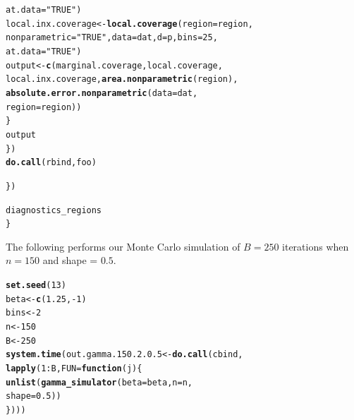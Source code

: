 \documentclass[11pt]{article}\usepackage[]{graphicx}\usepackage[]{color}
\makeatletter
\newcommand{\hlnum}[1]{\textcolor[rgb]{0.686,0.059,0.569}{#1}}%
\newcommand{\hlstr}[1]{\textcolor[rgb]{0.192,0.494,0.8}{#1}}%
\newcommand{\hlopt}[1]{\textcolor[rgb]{0,0,0}{#1}}%
\newcommand{\hlstd}[1]{\textcolor[rgb]{0.345,0.345,0.345}{#1}}%
\newcommand{\hlkwa}[1]{\textcolor[rgb]{0.161,0.373,0.58}{\textbf{#1}}}%
\newcommand{\hlkwb}[1]{\textcolor[rgb]{0.69,0.353,0.396}{#1}}%
\newcommand{\hlkwc}[1]{\textcolor[rgb]{0.333,0.667,0.333}{#1}}%
\newcommand{\hlkwd}[1]{\textcolor[rgb]{0.737,0.353,0.396}{\textbf{#1}}}%
\newenvironment{kframe}{%
 \def\at@end@of@kframe{}%
 \ifinner\ifhmode%
  \def\at@end@of@kframe{\end{minipage}}%
  \begin{minipage}{\columnwidth}%
 \fi\fi%
 \def\FrameCommand##1{\hskip\@totalleftmargin \hskip-\fboxsep
 \colorbox{shadecolor}{##1}\hskip-\fboxsep
     \hskip-\linewidth \hskip-\@totalleftmargin \hskip\columnwidth}%
 \MakeFramed {\advance\hsize-\width
   \@totalleftmargin\z@ \linewidth\hsize
   \@setminipage}}%
 {\par\unskip\endMakeFramed%
 \at@end@of@kframe}
\newenvironment{knitrout}{}{} %
\makeatother
\begin{document}
\begin{knitrout}
\begin{kframe}
\begin{alltt}
          \hlkwc{at.data} \hlstd{=} \hlstr{"TRUE"}\hlstd{)}
        \hlstd{local.inx.coverage} \hlkwb{<-} \hlkwd{local.coverage}\hlstd{(}\hlkwc{region} \hlstd{= region,}
          \hlkwc{nonparametric} \hlstd{=} \hlstr{"TRUE"}\hlstd{,} \hlkwc{data} \hlstd{= dat,} \hlkwc{d} \hlstd{= p,} \hlkwc{bins} \hlstd{=} \hlnum{25}\hlstd{,}
          \hlkwc{at.data} \hlstd{=} \hlstr{"TRUE"}\hlstd{)}
        \hlstd{output} \hlkwb{<-} \hlkwd{c}\hlstd{(marginal.coverage, local.coverage,}
          \hlstd{local.inx.coverage,} \hlkwd{area.nonparametric}\hlstd{(region),}
          \hlkwd{absolute.error.nonparametric}\hlstd{(}\hlkwc{data} \hlstd{= dat,}
            \hlkwc{region} \hlstd{= region))}
      \hlstd{\}}
      \hlstd{output}
    \hlstd{\})}
    \hlkwd{do.call}\hlstd{(rbind, foo)}

  \hlstd{\})}

  \hlstd{diagnostics_regions}
\hlstd{\}}
\end{alltt}
\end{kframe}
\end{knitrout}



The following performs our Monte Carlo simulation of $B = 250$ iterations 
when $n = 150$ and shape = $0.5$.

\begin{knitrout}
\color{fgcolor}\begin{kframe}
\begin{alltt}
\hlkwd{set.seed}\hlstd{(}\hlnum{13}\hlstd{)}
\hlstd{beta} \hlkwb{<-} \hlkwd{c}\hlstd{(}\hlnum{1.25}\hlstd{,} \hlopt{-}\hlnum{1}\hlstd{)}
\hlstd{bins} \hlkwb{<-} \hlnum{2}
\hlstd{n} \hlkwb{<-} \hlnum{150}
\hlstd{B} \hlkwb{<-} \hlnum{250}
\hlkwd{system.time}\hlstd{(out.gamma.150.2.0.5} \hlkwb{<-} \hlkwd{do.call}\hlstd{(cbind,}
  \hlkwd{lapply}\hlstd{(}\hlnum{1}\hlopt{:}\hlstd{B,} \hlkwc{FUN} \hlstd{=} \hlkwa{function}\hlstd{(}\hlkwc{j}\hlstd{)\{}
    \hlkwd{unlist}\hlstd{(}\hlkwd{gamma_simulator}\hlstd{(}\hlkwc{beta} \hlstd{= beta,} \hlkwc{n} \hlstd{= n,}
      \hlkwc{shape} \hlstd{=} \hlnum{0.5}\hlstd{))}
\hlstd{\})))}
\end{alltt}


{\ttfamily\noindent\bfseries\color{errorcolor}{\#\# Error in r[, l]/mad.predict.fun(out.mad, xx): non-numeric argument to binary operator}}

{\ttfamily\noindent\itshape\color{messagecolor}{\#\# Timing stopped at: 1.801 0 1.801}}\end{kframe}
\end{knitrout}
\end{document}
